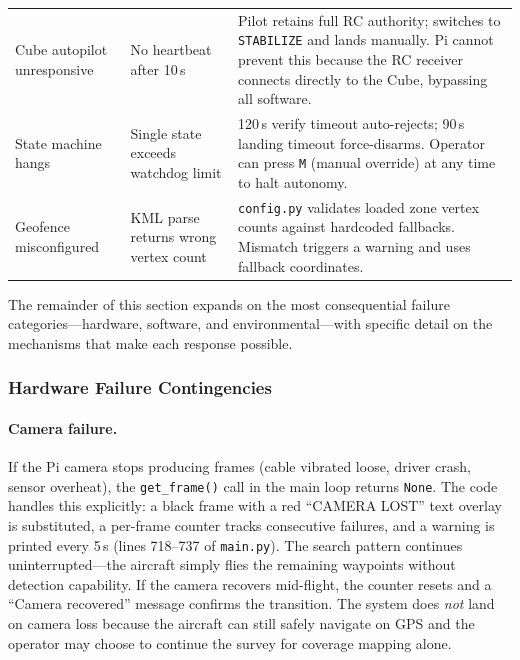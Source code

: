 \begin{table}[htbp]
\begin{tabularx}{\linewidth}{@{}p{2.6cm}p{3.0cm}X@{}}
    Cube autopilot unresponsive & No heartbeat after 10\,s & Pilot retains full RC authority; switches to \texttt{STABILIZE} and lands manually.  Pi cannot prevent this because the RC receiver connects directly to the Cube, bypassing all software. \\
    State machine hangs & Single state exceeds watchdog limit & 120\,s verify timeout auto-rejects; 90\,s landing timeout force-disarms.  Operator can press \texttt{M} (manual override) at any time to halt autonomy. \\
    Geofence misconfigured & KML parse returns wrong vertex count & \texttt{config.py} validates loaded zone vertex counts against hardcoded fallbacks. Mismatch triggers a warning and uses fallback coordinates. \\
    \bottomrule
  \end{tabularx}
\end{table}

The remainder of this section expands on the most consequential failure categories---hardware, software, and environmental---with specific detail on the mechanisms that make each response possible.

\subsubsection{Hardware Failure Contingencies}\label{sec:hw-contingencies}

\paragraph{Camera failure.}
If the Pi camera stops producing frames (cable vibrated loose, driver crash, sensor overheat), the \texttt{get\_frame()} call in the main loop returns \texttt{None}. The code handles this explicitly: a black frame with a red ``CAMERA LOST'' text overlay is substituted, a per-frame counter tracks consecutive failures, and a warning is printed every 5\,s (lines 718--737 of \texttt{main.py}).  The search pattern continues uninterrupted---the aircraft simply flies the remaining waypoints without detection capability.  If the camera recovers mid-flight, the counter resets and a ``Camera recovered'' message confirms the transition.  The system does \emph{not} land on camera loss because the aircraft can still safely navigate on GPS and the operator may choose to continue the survey for coverage mapping alone.


